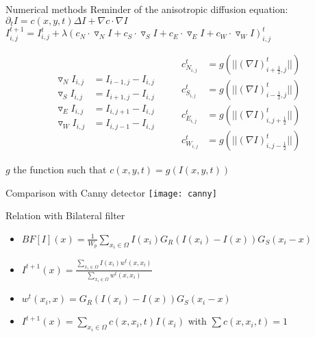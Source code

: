 \documentclass[aspectratio=169,xcolor=dvipsnames]{beamer}
\begin{document}
\begin{frame}{Numerical methods}
    Reminder of the anisotropic diffusion equation: $\partial_t I = c(x, y, t)\Delta I+\nabla c\cdot\nabla I$
    \pause
    \centering
    $I_{i,j}^{t+1}=I_{i,j}^t + \lambda(c_N \cdot \triangledown_N I + c_S \cdot \triangledown_S I + c_E \cdot \triangledown_E I + c_W \cdot \triangledown_W I)_{i,j}^t$
    
    \pause
    $$
      \begin{split}
        \triangledown_N I_{i,j} &= I_{i-1,j}-I_{i,j}\\
        \triangledown_S I_{i,j} &= I_{i+1,j}-I_{i,j}\\
        \triangledown_E I_{i,j} &= I_{i,j+1}-I_{i,j}\\
        \triangledown_W I_{i,j} &= I_{i,j-1}-I_{i,j}
      \end{split}
    \quad\quad
      \begin{split}
        c_{N_{i,j}}^t &= g(||(\nabla I)_{i+\frac{1}{2},j}^t||)\\
        c_{S_{i,j}}^t &= g(||(\nabla I)_{i-\frac{1}{2},j}^t||)\\
        c_{E_{i,j}}^t &= g(||(\nabla I)_{i,j+\frac{1}{2}}^t||)\\
        c_{W_{i,j}}^t &= g(||(\nabla I)_{i,j-\frac{1}{2}}^t||)
      \end{split}$$
      
       $g$ the function such that $c(x,y,t)=g(I(x,y,t))$
\end{frame}


\begin{frame}{Comparison with Canny detector}
    \centering
    \texttt{[image: canny]}
\end{frame}

\begin{frame}{Relation with Bilateral filter}
\begin{itemize}
    \item $BF[I](x)=\frac{1}{W_p}\sum_{x_i\in\Omega} I(x_i) G_R (I(x_i) - I(x)) G_S(x_i - x) $
    \pause
    \item $I^{t+1}(x) = \frac{\sum_{x_i\in \Omega}I(x_i)w^t(x,x_i)}{\sum_{x_i\in\Omega}w^t (x,x_i)}$
    \pause
    \item $w^t(x_i,x)=G_R(I(x_i) - I(x))G_S(x_i - x)$
    \pause
    \item $I^{t+1}(x)=\sum_{x_i\in\Omega}c(x,x_i,t)I(x_i)$ with $\sum c(x,x_i,t)=1$
    \pause
\end{itemize}
    
\end{frame}
\end{document}
